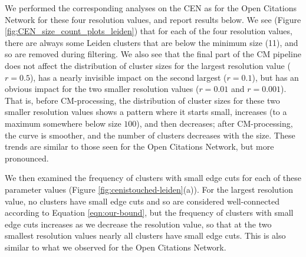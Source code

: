 \documentclass[11pt]{article}   	%
\begin{document}
We performed the corresponding analyses on the CEN as for the Open Citations Network for these four resolution values, and report results below.
We see (Figure \ref{fig:CEN_size_count_plots_leiden}) that  for each of the four resolution values, there are always some Leiden clusters  that are below
the minimum size (11), and so are removed during filtering. We also see that  the final part of the CM pipeline does not affect the distribution of cluster sizes for the
largest resolution value ($r=0.5$), has a nearly invisible impact on the second largest ($r=0.1$), but has an obvious impact for the two smaller resolution values
($r=0.01$ and $r=0.001$).
That is, before CM-processing, the distribution of cluster sizes for these two smaller resolution values shows a pattern where it starts small, increases (to a maximum somewhere
below size $100$), and then decreases; after CM-processing, the curve is smoother, and the number of clusters  decreases with the size.
These trends are similar to those seen for the Open Citations Network, but more pronounced.

We then examined the frequency of   clusters with small edge cuts for each of these parameter values (Figure \ref{fig:cenistouched-leiden}(a)).
For the largest resolution value, no clusters have small edge cuts and so are considered  well-connected according to Equation \ref{eqn:our-bound}, but the frequency of clusters with small edge cuts increases as we decrease the resolution value, so that at the two smallest resolution values nearly all clusters have small edge cuts.
This is also similar to what we observed for the Open Citations Network.
\end{document}

